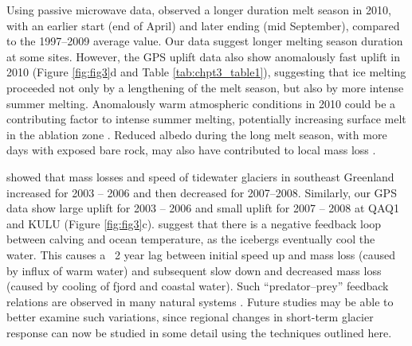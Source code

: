 Using passive microwave data, \cite{box2010greenland}
observed a longer duration melt season in 2010,
with an earlier start (end of April) and later ending
(mid September), compared to the 1997–2009
average value. Our data suggest longer melting
season duration at some sites. However, the GPS
uplift data also show anomalously fast uplift in
2010 (Figure \ref{fig:fig3}d and Table \ref{tab:chpt3_table1}), suggesting that ice
melting proceeded not only by a lengthening of the
melt season, but also by more intense summer
melting. Anomalously warm atmospheric conditions
in 2010 could be a contributing factor to intense
summer melting, potentially increasing surface melt
in the ablation zone \cite[]{zwally2002surface}. Reduced
albedo during the long melt season, with more days
with exposed bare rock, may also have contributed
to local mass loss \cite[]{tedesco2011role}.

\cite{murray2010ocean} showed that mass losses
and speed of tidewater glaciers in southeast Greenland
increased for 2003 – 2006 and then decreased
for 2007–2008. Similarly, our GPS data show large
uplift for 2003 – 2006 and small uplift for 2007 –
2008 at QAQ1 and KULU (Figure \ref{fig:fig3}c). \cite{murray2010ocean} suggest that there is a negative feedback loop
between calving and ocean temperature, as the icebergs
eventually cool the water. This causes a ~2 year
lag between initial speed up and mass loss (caused by
influx of warm water) and subsequent slow down and
decreased mass loss (caused by cooling of fjord and
coastal water). Such “predator–prey” feedback relations
are observed in many natural systems \cite[e.g.,][]{walker1981negative,douglass2005climate,koren2011aerosol}. Future studies may be able to better examine such variations, since regional changes in short-term glacier response can now be studied in some detail using the techniques outlined here.

